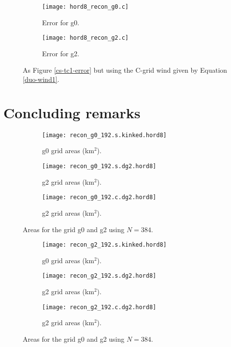 \begin{figure}[!htb]
	\centering
	\begin{subfigure}{0.45\textwidth}
		\centering
		\texttt{[image: hord8\_recon\_g0.c]}
		\caption{Error for g0.\label{cs-recon-g0}}
	\end{subfigure}
	\begin{subfigure}{0.45\textwidth}
		\centering
		\texttt{[image: hord8\_recon\_g2.c]}
		\caption{Error for g2.\label{cs-recon-g2}}
	\end{subfigure}
	\caption{As Figure \ref{cs-tc1-error} but using the C-grid wind given by Equation \eqref{duo-wind1}.\label{cs-recon-error}}
\end{figure}

\section{Concluding remarks}
\label{cs-conc}

\newpage
\begin{figure}[!htb]
	\centering
	\begin{subfigure}{0.9\textwidth}
		\centering
		\texttt{[image: recon\_g0\_192.s.kinked.hord8]}
		\caption{g0 grid areas (km$^2$).}
	\end{subfigure}
	
	\begin{subfigure}{0.9\textwidth}
		\centering
		\texttt{[image: recon\_g0\_192.s.dg2.hord8]}
		\caption{g2 grid areas (km$^2$).}
	\end{subfigure}
	
	\begin{subfigure}{0.9\textwidth}
		\centering
		\texttt{[image: recon\_g0\_192.c.dg2.hord8]}
		\caption{g2 grid areas (km$^2$).}
	\end{subfigure}
	\caption{Areas for the grid g0 and g2 using $N=384$.\label{cs-recon-errors-g0}}
\end{figure}

\newpage
\begin{figure}[!htb]
	\centering
	\begin{subfigure}{0.9\textwidth}
		\centering
		\texttt{[image: recon\_g2\_192.s.kinked.hord8]}
		\caption{g0 grid areas (km$^2$).}
	\end{subfigure}
	
	\begin{subfigure}{0.9\textwidth}
		\centering
		\texttt{[image: recon\_g2\_192.s.dg2.hord8]}
		\caption{g2 grid areas (km$^2$).}
	\end{subfigure}
	
	\begin{subfigure}{0.9\textwidth}
		\centering
		\texttt{[image: recon\_g2\_192.c.dg2.hord8]}
		\caption{g2 grid areas (km$^2$).}
	\end{subfigure}
	\caption{Areas for the grid g0 and g2 using $N=384$.\label{cs-recon-errors-g2}}
\end{figure}



